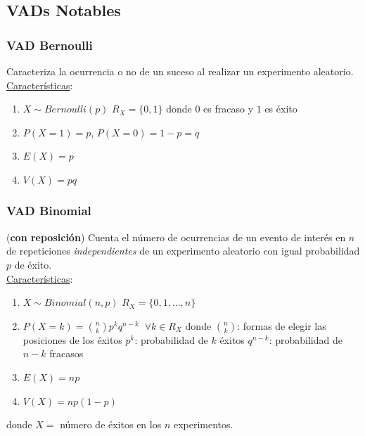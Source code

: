 \documentclass{article}
\begin{document}
\subsection{VADs Notables}
\subsubsection{VAD Bernoulli}
Caracteriza la ocurrencia o no de un suceso al realizar un experimento aleatorio.
\\\underline{Características}:
\begin{enumerate}
    \item $X \sim Bernoulli(p)$
        \subitem $R_X = \{ 0, 1 \}$ donde $0$ es fracaso y $1$ es éxito
    \item $P(X=1) = p$, $P(X=0) = 1 - p = q$
    \item $E(X) = p$
    \item $V(X) = pq$
\end{enumerate}

\subsubsection{VAD Binomial}
(\textbf{con reposición}) Cuenta el número de ocurrencias de un evento de interés en $n$ de repeticiones \emph{independientes} de un experimento aleatorio con igual probabilidad $p$ de éxito. 
\\\underline{Características}:
\begin{enumerate}
    \item $X \sim Binomial(n,p)$
        \subitem $R_X = \{0,1,...,n\}$
    \item $P(X = k) = {{n}\choose{k}} p^k q^{n-k} \;\; \forall k \in R_X$
    donde  
        \subitem ${{n}\choose{k}}$: formas de elegir las posiciones de los éxitos
        \subitem $p^k$:  probabilidad de $k$ éxitos 
        \subitem $q^{n-k}$: probabilidad de $n-k$ fracasos
    \item $E(X) = np$
    \item $V(X) = np(1-p)$
\end{enumerate}
donde $X =$ número de éxitos en los $n$ experimentos.
\end{document}
